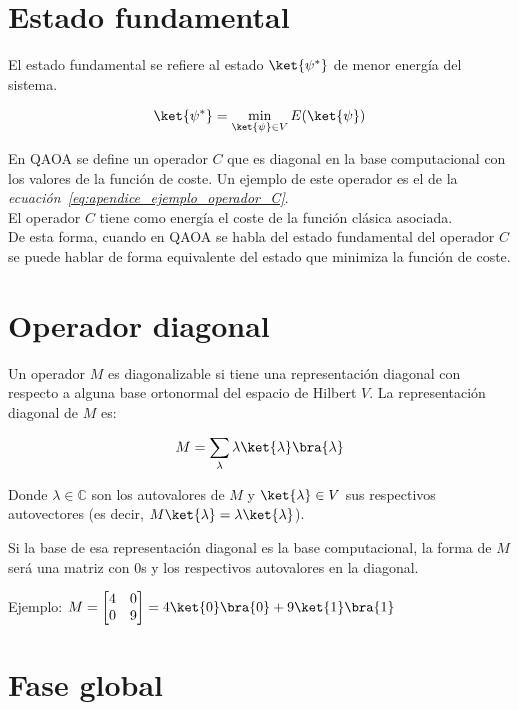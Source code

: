 \section{Estado fundamental\label{sec:8-concepto-estado_fundamental}}

El estado fundamental se refiere al estado $\ket{\psi^*}$ de menor energía del sistema.

\begin{align}
  \ket{\psi^*} = \min_{\ket{\psi} \in V} E(\ket{\psi})
\end{align}

En QAOA se define un operador $C$ que es diagonal en la base computacional con los valores de la función de coste.
Un ejemplo de este operador es el de la \textit{ecuación~\ref{eq:apendice_ejemplo_operador_C}}.
\\
El operador $C$ tiene como energía el coste de la función clásica asociada.
\\
De esta forma, cuando en QAOA se habla del estado fundamental del operador $C$ se puede hablar de forma equivalente del estado que minimiza la función de coste.


\section{Operador diagonal\label{sec:8-concepto-diagonal}}

Un operador $M$ es diagonalizable si tiene una representación diagonal con respecto a alguna base ortonormal del espacio de Hilbert $V$.
La representación diagonal de $M$ es:

\begin{align}
  M = \sum_\lambda \lambda \ket{\lambda} \bra{\lambda}
\end{align}

Donde $\lambda \in \mathbb{C}$ son los autovalores de $M$ y $\ket{\lambda} \in V$ sus respectivos autovectores (es decir, $M \ket{\lambda} = \lambda \ket{\lambda}$).

Si la base de esa representación diagonal es la base computacional, la forma de $M$ será una matriz con 0s y los respectivos autovalores en la diagonal.

Ejemplo: $M = \begin{bmatrix}
  4 & 0 \\
  0 & 9
\end{bmatrix} = 4\ket{0} \bra{0} + 9\ket{1} \bra{1}$


\section{Fase global\label{sec:8-concepto-fase_global}}

